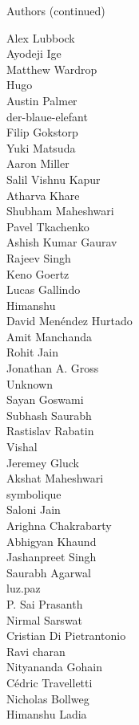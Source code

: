 \begin{frame}{Authors (continued)}
\begin{multicols}{5}
\tiny
Alex Lubbock\\
Ayodeji Ige\\
Matthew Wardrop\\
Hugo\\
Austin Palmer\\
der-blaue-elefant\\
Filip Gokstorp\\
Yuki Matsuda\\
Aaron Miller\\
Salil Vishnu Kapur\\
Atharva Khare\\
Shubham Maheshwari\\
Pavel Tkachenko\\
Ashish Kumar Gaurav\\
Rajeev Singh\\
Keno Goertz\\
Lucas Gallindo\\
Himanshu\\
David Menéndez Hurtado\\
Amit Manchanda\\
Rohit Jain\\
Jonathan A. Gross\\
Unknown\\
Sayan Goswami\\
Subhash Saurabh\\
Rastislav Rabatin\\
Vishal\\
Jeremey Gluck\\
Akshat Maheshwari\\
symbolique\\
Saloni Jain\\
Arighna Chakrabarty\\
Abhigyan Khaund\\
Jashanpreet Singh\\
Saurabh Agarwal\\
luz.paz\\
P. Sai Prasanth\\
Nirmal Sarswat\\
Cristian Di Pietrantonio\\
Ravi charan\\
Nityananda Gohain\\
Cédric Travelletti\\
Nicholas Bollweg\\
Himanshu Ladia\\

\end{multicols}
\end{frame}
